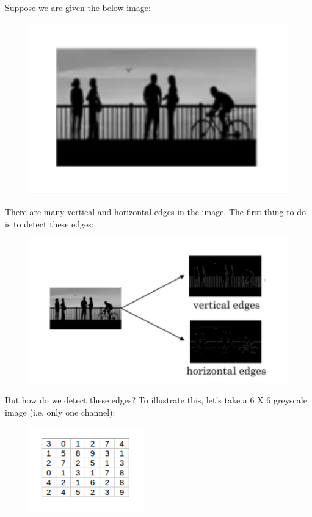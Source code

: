 \documentclass[a4paper]{article}
\begin{document}
 Suppose we are given the below image: 

{\graphicspath{{Images/}}
\begin{figure}[htp]
    \centering
    \includegraphics[width=12cm]{Image.png}
\end{figure}
}


\clearpage

 There are many vertical and horizontal edges in the image. The first thing to do is to detect these edges:
{
\begin{figure}[htp]
    \centering
    \includegraphics[width=500]{split.png}
\end{figure} }

But how do we detect these edges? To illustrate this, let’s take a 6 X 6 greyscale image (i.e. only one channel): 
{
\begin{figure}[htp]
    \centering
    \includegraphics[width=5cm]{greyscale.png}
\end{figure}
}
\end{document}
